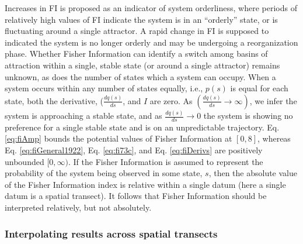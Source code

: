 \documentclass[12pt,twoside,openany]{reedthesis}
\begin{document}
Increases in FI is proposed as an indicator of system orderliness, where periods of relatively high values of FI indicate the system is in an ``orderly'' state, or is fluctuating around a single attractor. A rapid change in FI is supposed to indicated the system is no longer orderly and may be undergoing a reorganization phase. Whether Fisher Information can identify a switch among basins of attraction within a single, stable state (or around a single attractor) remains unknown, as does the number of states which a system can occupy. When a system occurs within any number of states equally, i.e., \(p(s)\) is equal for each state, both the derivative, (\(\frac{dq(s)}{ds}\), and \(I\) are zero. As \((\frac{dq(s)}{ds} \rightarrow \infty)\), we infer the system is approaching a stable state, and as \(\frac{dq(s)}{ds} \rightarrow 0\) the system is showing no preference for a single stable state and is on an unpredictable trajectory. Eq. \eqref{eq:fiAmp} bounds the potential values of Fisher Information at \([0, 8]\), whereas Eq. \eqref{eq:fiGeneral1922}, Eq. \eqref{eq:fi73c}, and Eq. \eqref{eq:fiDerivs} are positively unbounded \([0, \infty)\). If the Fisher Information is assumed to represent the probability of the system being observed in some state, \(s\), then the absolute value of the Fisher Information index is relative within a single datum (here a single datum is a spatial transect). It follows that Fisher Information should be interpreted relatively, but not absolutely.

\hypertarget{interpolating-results-across-spatial-transects}{%
\subsubsection{Interpolating results across spatial transects}\label{interpolating-results-across-spatial-transects}}
\end{document}
